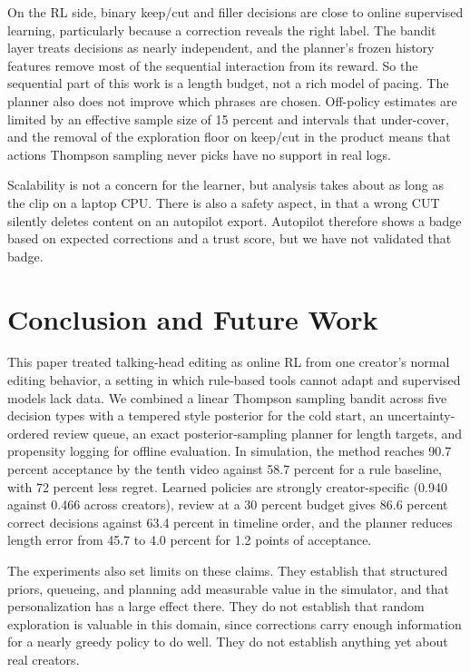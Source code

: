\documentclass{ieeeaccess}
\begin{document}
On the RL side, binary keep/cut and filler decisions are close to online supervised learning, particularly because a correction reveals the right label. The bandit layer treats decisions as nearly independent, and the planner's frozen history features remove most of the sequential interaction from its reward. So the sequential part of this work is a length budget, not a rich model of pacing. The planner also does not improve which phrases are chosen. Off-policy estimates are limited by an effective sample size of 15 percent and intervals that under-cover, and the removal of the exploration floor on keep/cut in the product means that actions Thompson sampling never picks have no support in real logs.

Scalability is not a concern for the learner, but analysis takes about as long as the clip on a laptop CPU. There is also a safety aspect, in that a wrong CUT silently deletes content on an autopilot export. Autopilot therefore shows a badge based on expected corrections and a trust score, but we have not validated that badge.

\section{Conclusion and Future Work}
\label{sec:conclusion}
This paper treated talking-head editing as online RL from one creator's normal editing behavior, a setting in which rule-based tools cannot adapt and supervised models lack data. We combined a linear Thompson sampling bandit across five decision types with a tempered style posterior for the cold start, an uncertainty-ordered review queue, an exact posterior-sampling planner for length targets, and propensity logging for offline evaluation. In simulation, the method reaches 90.7 percent acceptance by the tenth video against 58.7 percent for a rule baseline, with 72 percent less regret. Learned policies are strongly creator-specific (0.940 against 0.466 across creators), review at a 30 percent budget gives 86.6 percent correct decisions against 63.4 percent in timeline order, and the planner reduces length error from 45.7 to 4.0 percent for 1.2 points of acceptance.

The experiments also set limits on these claims. They establish that structured priors, queueing, and planning add measurable value in the simulator, and that personalization has a large effect there. They do not establish that random exploration is valuable in this domain, since corrections carry enough information for a nearly greedy policy to do well. They do not establish anything yet about real creators.
\end{document}
